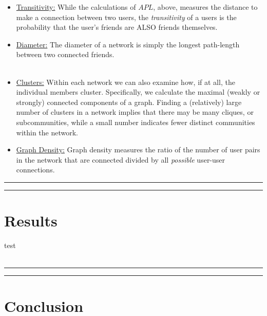 \documentclass[fleqn]{article}
\begin{document}
\begin{itemize}
\item \underline{Transitivity:} While the calculations of $APL$, above, measures the distance to make a connection between two users, the \emph{transitivity} of a users is the probability that the user's friends are ALSO friends themselves.

\item \underline{Diameter:} The diameter of a network is simply the longest path-length between two connected friends. \\ \\ 

\item \underline{Clusters:} Within each network we can also examine how, if at all, the individual members cluster. Specifically, we calculate the maximal (weakly or strongly) connected components of a graph. Finding a (relatively) large number of clusters in a network implies that there may be many cliques, or subcommunities, while a small number indicates fewer distinct communities within the network. 

\item \underline{Graph Density:} Graph density measures the ratio of the number of user pairs in the network that are connected divided by all \textit{possible} user-user connections.
\end{itemize}
\hrule \hrule  
\section{Results} test \\ \\

\hrule \hrule 
\section{Conclusion}


\newpage 
\end{document}
